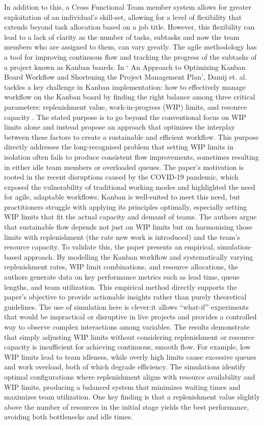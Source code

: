 \documentclass{report}
\begin{document}
In addition to this, a Cross Functional Team member system allows for greater exploitation of an individual’s skill-set, allowing for a level of flexibility that extends beyond task allocation based on a job title. However, this flexibility can lead to a lack of clarity as the number of tasks, subtasks and now the team members who are assigned to them, can vary greatly. 
The agile methodology has a tool for improving continuous flow and tracking the progress of the subtasks of a project known as Kanban boards. In ‘ An Approach to Optimizing Kanban Board Workflow and Shortening the Project Management Plan’, Damij et. al. tackles a key challenge in Kanban implementation: how to effectively manage workflow on the Kanban board by finding the right balance among three critical parameters: replenishment value, work-in-progress (WIP) limits, and resource capacity \parencite{damijApproachOptimizingKanban2024}. The stated purpose is to go beyond the conventional focus on WIP limits alone and instead propose an approach that optimises the interplay between these factors to create a sustainable and efficient workflow. This purpose directly addresses the long-recognised problem that setting WIP limits in isolation often fails to produce consistent flow improvements, sometimes resulting in either idle team members or overloaded queues.
The paper’s motivation is rooted in the recent disruptions caused by the COVID-19 pandemic, which exposed the vulnerability of traditional working modes and highlighted the need for agile, adaptable workflows. Kanban is well-suited to meet this need, but practitioners struggle with applying its principles optimally, especially setting WIP limits that fit the actual capacity and demand of teams. The authors argue that sustainable flow depends not just on WIP limits but on harmonising those limits with replenishment (the rate new work is introduced) and the team’s resource capacity.
To validate this, the paper presents an empirical, simulation-based approach. By modelling the Kanban workflow and systematically varying replenishment rates, WIP limit combinations, and resource allocations, the authors generate data on key performance metrics such as lead time, queue lengths, and team utilization. This empirical method directly supports the paper’s objective to provide actionable insights rather than purely theoretical guidelines. The use of simulation here is clever:it allows “what-if” experiments that would be impractical or disruptive in live projects and provides a controlled way to observe complex interactions among variables.
The results demonstrate that simply adjusting WIP limits without considering replenishment or resource capacity is insufficient for achieving continuous, smooth flow. For example, low WIP limits lead to team idleness, while overly high limits cause excessive queues and work overload, both of which degrade efficiency. The simulations identify optimal configurations where replenishment aligns with resource availability and WIP limits, producing a balanced system that minimizes waiting times and maximizes team utilization. One key finding is that a replenishment value slightly above the number of resources in the initial stage yields the best performance, avoiding both bottlenecks and idle times.
\end{document}
